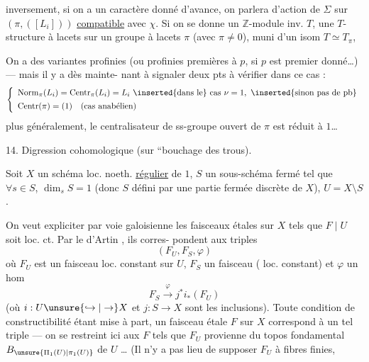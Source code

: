

inversement, si on a un caractère  donné d'avance,
on parlera d'action de $\Sigma$ sur $(\pi,([L_i]))$
\uline{compatible} avec $\chi$. Si on se donne un
$\mathbb Z$-module inv. $T$, une $T$-structure à lacets
sur un groupe à lacets $\pi$ (avec $\pi\ne0$), muni
d'un isom $T\simeq T_\pi$, 

On a des variantes profinies
(ou profinies premières à $p$, si $p$ est premier
donné\dots) --- mais il y a dès mainte-
nant à signaler deux pts à vérifier dans
ce cas :
\[
\left\{
\begin{array}{l}
\operatorname{Norm}_{\pi}(L_i)=\operatorname{Centr}_{\pi}(L_i)=L_i
\ \inserted{\text{dans le}}\ \text{cas }\nu=1,\ \inserted{\text{sinon pas de pb}}\\[4pt]
\operatorname{Centr}(\pi)=(1)\quad(\text{cas anabélien})
\end{array}
\right.
\]
plus généralement, le centralisateur
de  ss-groupe ouvert de $\pi$
est réduit à $1$\dots
{}



14. Digression cohomologique (sur  ``bouchage des
trous).

Soit $X$ un schéma loc. noeth. \uline{régulier} de
 $1$, $S$ un sous-schéma fermé  tel que
$\forall s\in S$, $\dim_s S=1$ (donc $S$ défini par une
partie fermée discrète de $X$), $U=X\setminus S$.

On veut expliciter par voie galoisienne les
faisceaux  étales  sur $X$ tels que $F\mid U$ soit
loc. ct. Par le  d'Artin , ils corres-
pondent aux triples
\[
(F_U,F_S,\varphi)
\]
où $F_U$ est un faisceau  loc. constant sur $U$,
$F_S$ un faisceau ( loc. constant)
et $\varphi$ un hom
\[
F_S\xrightarrow{\varphi}j^{*}i_{*}(F_U)
\]
(où $i:U\unsure{\hookrightarrow|\to}X$ et $j:S\to X$ sont les inclusions).
Toute condition de constructibilité étant mise à
part, un faisceau étale $F$ sur $X$ correspond
à un tel triple --- on se restreint ici aux
$F$ tels que $F_U$  provienne du
topos fondamental $B_{\unsure{\Pi_1(U)|\pi_1(U)}}$ de $U$ \dots
(Il n'y a pas lieu de supposer $F_U$ à fibres finies,

